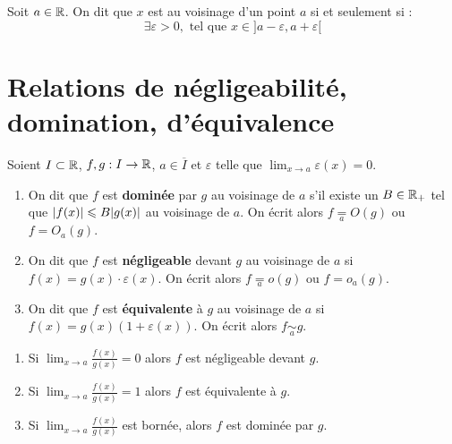 \begin{definition} 
    Soit $a \in \mathbb{R}$.
    On dit que $x$ est au voisinage d'un point $a$ si et seulement si :
    \[ \exists \varepsilon > 0, \text{ tel que } x \in ]a - \varepsilon, a + \varepsilon[ \]
\end{definition}

\section{Relations de négligeabilité, domination, d'équivalence}
\begin{definition}
    Soient $I \subset \mathbb{R}$, $f, g : I \to \mathbb{R}$, $a \in \overline{I}$ et $\varepsilon$ telle que $\lim_{x \to a} \varepsilon(x) = 0$.
    \begin{enumerate}
        \item On dit que $f$ est \textbf{dominée} par $g$ au voisinage de $a$ s'il existe un $B \in \mathbb{R}_+$ tel que $\abs{f(x)} \leqslant B \abs{g(x)}$ au voisinage de $a$. 
        On écrit alors $f \underset{a}{=} O(g)$ ou $f = O_a(g)$.
        \item On dit que $f$ est \textbf{négligeable} devant $g$ au voisinage de $a$ si $f(x) = g(x) \cdot \varepsilon(x)$.
        On écrit alors $f \underset{a}{=} o(g)$ ou $f = o_a(g)$.
        \item On dit que $f$ est \textbf{équivalente} à $g$ au voisinage de $a$ si $f(x) = g(x) (1 + \varepsilon(x))$.
        On écrit alors $f \underset{a}{\sim} g$.
    \end{enumerate}
\end{definition}

\begin{proposition}
    \begin{enumerate}
        \item Si $\lim_{x \to a} \frac{f(x)}{g(x)} = 0$ alors $f$ est négligeable devant $g$.
        \item Si $\lim_{x \to a} \frac{f(x)}{g(x)} = 1$ alors $f$ est équivalente à $g$.
        \item Si $\lim_{x \to a} \frac{f(x)}{g(x)}$ est bornée, alors $f$ est dominée par $g$.
    \end{enumerate}   
\end{proposition}


